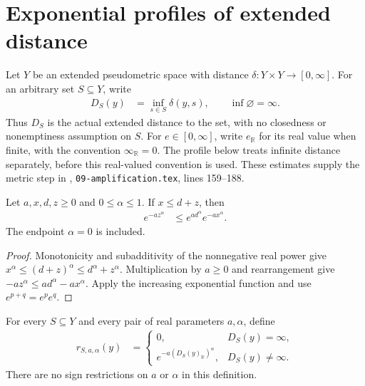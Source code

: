\section{Exponential profiles of extended distance}
\label{sec:exponential_distance_profile}

Let $Y$ be an extended pseudometric space with distance
$\delta:Y\times Y\to[0,\infty]$.  For an arbitrary set $S\subseteq Y$,
write
\begin{align}
    D_S(y) & =\inf_{s\in S}\delta(y,s),\qquad \inf\varnothing=\infty.
    \label{eq:exponential_profile_distance}
\end{align}
Thus $D_S$ is the actual extended distance to the set, with no
closedness or nonemptiness assumption on $S$.  For $e\in[0,\infty]$,
write $e_{\mathbb R}$ for its real value when finite, with the convention
$\infty_{\mathbb R}=0$.  The profile below treats infinite distance
separately, before this real-valued convention is used.
These estimates supply the metric step in \cite{OpenAI2026AreaLaw},
\texttt{09-amplification.tex}, lines 159--188.

\begin{lemma}
    \label{lem:exp_neg_mul_rpow_comparison}
    \leanok
    Let $a,x,d,z\geq0$ and $0\leq\alpha\leq1$.  If $x\leq d+z$, then
    \begin{align}
        e^{-az^\alpha} & \leq e^{ad^\alpha}e^{-ax^\alpha}.
        \label{eq:exp_neg_mul_rpow_comparison}
    \end{align}
    The endpoint $\alpha=0$ is included.
\end{lemma}
\begin{proof}
    \leanok
    Monotonicity and subadditivity of the nonnegative real power give
    $x^\alpha\leq(d+z)^\alpha\leq d^\alpha+z^\alpha$.
    Multiplication by $a\geq0$ and rearrangement give
    $-az^\alpha\leq ad^\alpha-ax^\alpha$.
    Apply the increasing exponential function and use
    $e^{p+q}=e^pe^q$.
\end{proof}

\begin{definition}
    \label{def:exponential_distance_profile}
    \leanok
    For every $S\subseteq Y$ and every pair of real parameters $a,\alpha$,
    define
    \begin{align}
        \label{eq:exponential_distance_profile}
        r_{S,a,\alpha}(y) & =
        \left\{\begin{array}{ll}
                   0,                                 & D_S(y)=\infty,   \\
                   e^{-a(D_S(y)_{\mathbb R})^\alpha}, & D_S(y)\ne\infty.
               \end{array}\right.
    \end{align}
    There are no sign restrictions on $a$ or $\alpha$ in this definition.
\end{definition}


